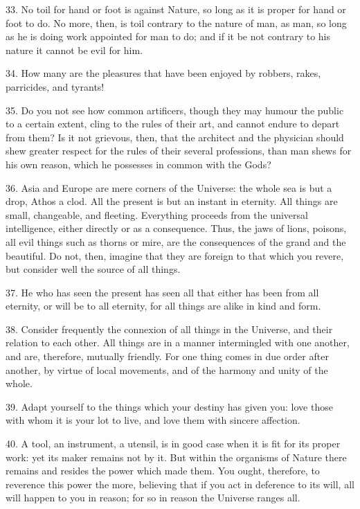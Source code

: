 \documentclass{book}
\begin{document}
33. No toil for hand or foot is against Nature, so long as it is
proper for hand or foot to do. No more, then, is toil contrary to the
nature of man, as man, so long as he is doing work appointed for man
to do; and if it be not contrary to his nature it cannot be evil for
him.

34. How many are the pleasures that have been enjoyed by robbers,
rakes, parricides, and tyrants!

35. Do you not see how common artificers, though they may humour the
public to a certain extent, cling to the rules of their art, and
cannot endure to depart from them? Is it not grievous, then, that the
architect and the physician should shew greater respect for the rules
of their several professions, than man shews for his own reason, which
he possesses in common with the Gods?

36. Asia and Europe are mere corners of the Universe: the whole sea is
but a drop, Athos a clod. All the present is but an instant in
eternity. All things are small, changeable, and fleeting. Everything
proceeds from the universal intelligence, either directly or as a
consequence. Thus, the jaws of lions, poisons, all evil things such as
thorns or mire, are the consequences of the grand and the
beautiful. Do not, then, imagine that they are foreign to that which
you revere, but consider well the source of all things.

37. He who has seen the present has seen all that either has been from
all eternity, or will be to all eternity, for all things are alike in
kind and form.

38. Consider frequently the connexion of all things in the Universe,
and their relation to each other. All things are in a manner
intermingled with one another, and are, therefore, mutually
friendly. For one thing comes in due order after another, by virtue of
local movements, and of the harmony and unity of the whole.

\newpage

39. Adapt yourself to the things which your destiny has given you:
love those with whom it is your lot to live, and love them with
sincere affection.

40. A tool, an instrument, a utensil, is in good case when it is fit
for its proper work: yet its maker remains not by it. But within the
organisms of Nature there remains and resides the power which made
them. You ought, therefore, to reverence this power the more,
believing that if you act in deference to its will, all will happen to
you in reason; for so in reason the Universe ranges all.
\end{document}
